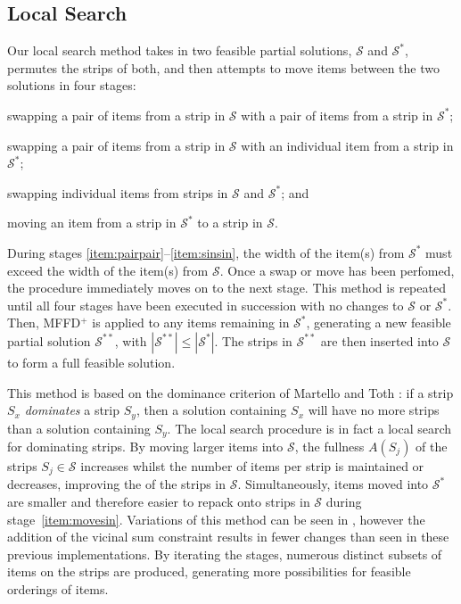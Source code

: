 \documentclass{elsarticle}
\begin{document}
\subsection{Local Search}
\label{sub:localsearch}
\noindent Our local search method takes in two feasible partial solutions, $\mathcal{S}$ and $\mathcal{S}^*$, permutes the strips of both, and then attempts to move items between the two solutions in four stages: 
\begin{enumerate*}[label={(\roman*)}]
	\item swapping a pair of items from a strip in $\mathcal{S}$ with a pair of items from a strip in $\mathcal{S}^*$;\label{item:pairpair}
	\item swapping a pair of items from a strip in $\mathcal{S}$ with an individual item from a strip in $\mathcal{S}^*$;\label{item:pairsin}
	\item swapping individual items from strips in $\mathcal{S}$ and $\mathcal{S}^*$;\label{item:sinsin} and
	\item moving an item from a strip in $\mathcal{S}^*$ to a strip in $\mathcal{S}$.\label{item:movesin}
\end{enumerate*} 
During stages \ref{item:pairpair}--\ref{item:sinsin}, the width of the item(s) from $\mathcal{S}^*$ must exceed the width of the item(s) from $\mathcal{S}$. Once a swap or move has been perfomed, the procedure immediately moves on to the next stage. This method is repeated until all four stages have been executed in succession with no changes to $\mathcal{S}$ or $\mathcal{S}^*$. Then, MFFD$^+$ is applied to any items remaining in $\mathcal{S}^*$, generating a new feasible partial solution $\mathcal{S}^{**}$, with $|\mathcal{S}^{**}| \leq |\mathcal{S}^*|$. The strips in $\mathcal{S}^{**}$ are then inserted into $\mathcal{S}$ to form a full feasible solution.

This method is based on the dominance criterion of Martello and Toth \cite{martello1990l}: if a strip $S_x$ \emph{dominates} a strip $S_y$, then a solution containing $S_x$ will have no more strips than a solution containing $S_y$. The local search procedure is in fact a local search for dominating strips. By moving larger items into $\mathcal{S}$, the fullness $A(S_j)$ of the strips  $S_j \in \mathcal{S}$ increases whilst the number of items per strip is maintained or decreases, improving the  of the strips in $\mathcal{S}$. Simultaneously, items moved into $\mathcal{S}^*$ are smaller and therefore easier to repack onto strips in $\mathcal{S}$ during stage~\ref{item:movesin}. Variations of this method can be seen in \cite{lewis2009, lewis2017, falkenauer1996, levine2004}, however the addition of the vicinal sum constraint results in fewer changes than seen in these previous implementations. By iterating the stages, numerous distinct subsets of items on the strips are produced, generating more possibilities for feasible orderings of items.
\end{document}
